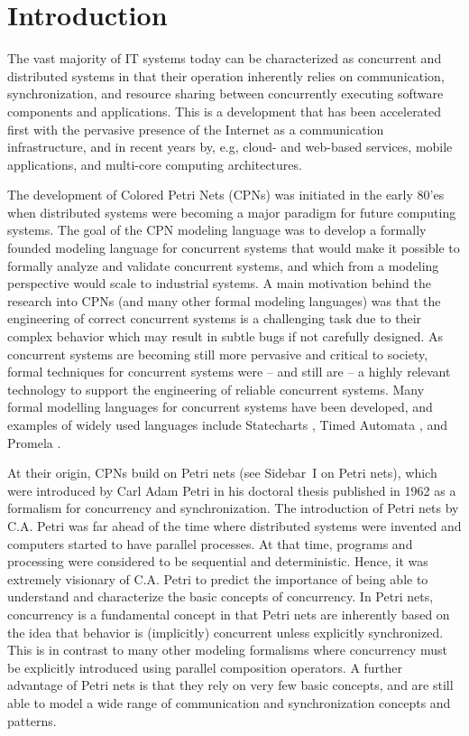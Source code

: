 \section{Introduction}

The vast majority of IT systems today can be characterized as
concurrent and distributed systems in that their operation inherently
relies on communication, synchronization, and resource sharing between
concurrently executing software components and applications. This is a
development that has been accelerated first with the pervasive
presence of the Internet as a communication infrastructure, and in
recent years by, e.g, cloud- and web-based services, mobile
applications, and multi-core computing architectures.


The development of Colored Petri Nets (CPNs) was initiated in the
early 80'es when distributed systems were becoming a major paradigm
for future computing systems. The goal of the CPN modeling language
was to develop a formally founded modeling language for concurrent
systems that would make it possible to formally analyze and validate
concurrent systems, and which from a modeling perspective would scale
to industrial systems. A main motivation behind the research into CPNs
(and many other formal modeling languages) was that the engineering of
correct concurrent systems is a challenging task due to their complex
behavior which may result in subtle bugs if not carefully designed. As
concurrent systems are becoming still more pervasive and critical to
society, formal techniques for concurrent systems were -- and still are
-- a highly relevant technology to support the engineering of reliable
concurrent systems. Many formal modelling languages for concurrent
systems have been developed, and examples of widely used languages
include Statecharts \cite{statecharts}, Timed Automata
\cite{timedautomata}, and Promela \cite{promela}.


At their origin, CPNs build on Petri nets (see Sidebar~I on Petri nets),
which were introduced by Carl Adam Petri in his doctoral thesis
published in 1962 \cite{capetri:thesis} as a formalism for concurrency
and synchronization. The introduction of Petri nets by C.A. Petri was
far ahead of the time where distributed systems were invented and
computers started to have parallel processes. At that time, programs
and processing were considered to be sequential and
deterministic. Hence, it was extremely visionary of C.A. Petri to
predict the importance of being able to understand and characterize
the basic concepts of concurrency. In Petri nets, concurrency is a
fundamental concept in that Petri nets are inherently based on the idea
that behavior is (implicitly) concurrent unless explicitly
synchronized. This is in contrast to many other modeling formalisms
where concurrency must be explicitly introduced using parallel
composition operators. A further advantage of Petri nets is that they
rely on very few basic concepts, and are still able to model a wide
range of communication and synchronization concepts and patterns.\\

